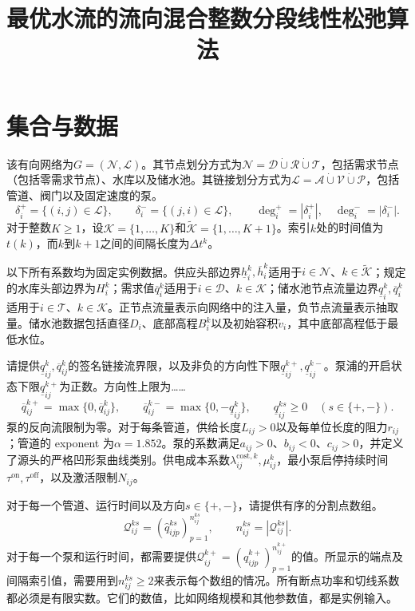 \documentclass{article}
\begin{document}
\title{最优水流的流向混合整数分段线性松弛算法}
\date{}
\maketitle

\section*{集合与数据}
该有向网络为$G=(\mathcal N,\mathcal L)$。其节点划分方式为$\mathcal N=\mathcal D\mathbin{\dot\cup}\mathcal R\mathbin{\dot\cup}\mathcal T$，包括需求节点（包括零需求节点）、水库以及储水池。其链接划分方式为$\mathcal L=\mathcal A\mathbin{\dot\cup}\mathcal V\mathbin{\dot\cup}\mathcal P$，包括管道、阀门以及固定速度的泵。
\[
\delta_i^+=\{(i,j)\in\mathcal L\},\qquad
\delta_i^-=\{(j,i)\in\mathcal L\},\qquad
\deg_i^+=|\delta_i^+|,\quad \deg_i^-=|\delta_i^-|.
\]
对于整数$K\ge1$，设$\mathcal K=\{1,\ldots,K\}$和$\widetilde{\mathcal K}=\{1,\ldots,K+1\}$。索引$k$处的时间值为$t(k)$，而$k$到$k+1$之间的间隔长度为$\Delta t^k$。

以下所有系数均为固定实例数据。供应头部边界$\underline h_i^k,\overline h_i^k$适用于$i\in\mathcal N$、$k\in\widetilde{\mathcal K}$；规定的水库头部边界为$H_i^k$；需求值$\overline q_i^k$适用于$i\in\mathcal D$、$k\in\mathcal K$；储水池节点流量边界$\underline q_i^k,\overline q_i^k$适用于$i\in\mathcal T$、$k\in\mathcal K$。正节点流量表示向网络中的注入量，负节点流量表示抽取量。储水池数据包括直径$D_i$、底部高程$B_i^k$以及初始容积$\widetilde v_i$，其中底部高程低于最低水位。

请提供$\underline q_{ij}^k,\overline q_{ij}^k$的签名链接流界限，以及非负的方向性下限$\underline q_{ij}^{k+},\underline q_{ij}^{k-}$。泵浦的开启状态下限$\underline q_{ij}^{k+}$为正数。方向性上限为……
\begin{equation}
\overline q_{ij}^{k+}=\max\{0,\overline q_{ij}^k\},\qquad
\overline q_{ij}^{k-}=\max\{0,-\underline q_{ij}^k\},\qquad
\underline q_{ij}^{ks}\ge0\quad(s\in\{+,-\}).
\tag{D1}
\end{equation}
泵的反向流限制为零。对于每条管道，供给长度$L_{ij}>0$以及每单位长度的阻力$r_{ij}$；管道的 exponent 为$\alpha=1.852$。泵的系数满足$a_{ij}>0$、$b_{ij}<0$、$c_{ij}>0$，并定义了源头的严格凹形泵曲线类别。供电成本系数$\lambda_{ij}^{\mathrm{cost},k},\mu_{ij}^k$，最小泵启停持续时间$\tau^{\mathrm{on}},\tau^{\mathrm{off}}$，以及激活限制$N_{ij}$。

对于每一个管道、运行时间以及方向$s\in\{+,-\}$，请提供有序的分割点数组。
\[
\mathcal Q_{ij}^{ks}=(\widehat q_{ijp}^{ks})_{p=1}^{n_{ij}^{ks}},\qquad n_{ij}^{ks}=|\mathcal Q_{ij}^{ks}|.
\]
对于每一个泵和运行时间，都需要提供$\mathcal Q_{ij}^{k+}=(\widehat q_{ijp}^{k+})_{p=1}^{n_{ij}^{k+}}$的值。所显示的端点及间隔索引值，需要用到$n_{ij}^{ks}\ge2$来表示每个数组的情况。所有断点功率和切线系数都必须是有限实数。它们的数值，比如网络规模和其他参数值，都是实例输入。
\end{document}
